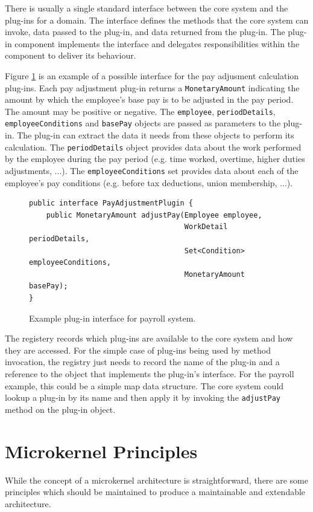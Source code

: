 There is usually a single standard interface between the core system and the plug-ins for a domain.
The interface defines the methods that the core system can invoke, data passed to the plug-in, and data returned from the plug-in.
The plug-in component implements the interface and delegates responsibilities within the component to deliver its behaviour.

Figure \ref{fig:interface} is an example of a possible interface for the pay adjusment calculation plug-ins.
Each pay adjustment plug-in returns a \texttt{MonetaryAmount} indicating the amount by which the employee's base pay is to be adjusted in the pay period.
The amount may be positive or negative.
The \texttt{employee}, \texttt{periodDetails}, \texttt{employeeConditions} and \texttt{basePay} objects are passed as parameters to the plug-in.
The plug-in can extract the data it needs from these objects to perform its calculation.
The \texttt{periodDetails} object provides data about the work performed by the employee during the pay period (e.g. time worked, overtime, higher duties adjustments, ...).
The \texttt{employeeConditions} set provides data about each of the employee's pay conditions (e.g. before tax deductions, union membership, ...).

\begin{figure}[h]
\centering
\begin{shaded}
\begin{lstlisting}[style=java]
public interface PayAdjustmentPlugin {
    public MonetaryAmount adjustPay(Employee employee,
                                    WorkDetail periodDetails,
                                    Set<Condition> employeeConditions,
                                    MonetaryAmount basePay);
}
\end{lstlisting}
\end{shaded}
\caption{Example plug-in interface for payroll system.}
\label{fig:interface}
\end{figure}

The registery records which plug-ins are available to the core system and how they are accessed.
For the simple case of plug-ins being used by method invocation,
the registry just needs to record the name of the plug-in and a reference to the object that implements the plug-in's interface.
For the payroll example, this could be a simple map data structure.
The core system could lookup a plug-in by its name and then apply it by invoking the \texttt{adjustPay} method on the plug-in object.

\section{Microkernel Principles}
While the concept of a microkernel architecture is straightforward,
there are some principles which should be maintained to produce a maintainable and extendable architecture.

